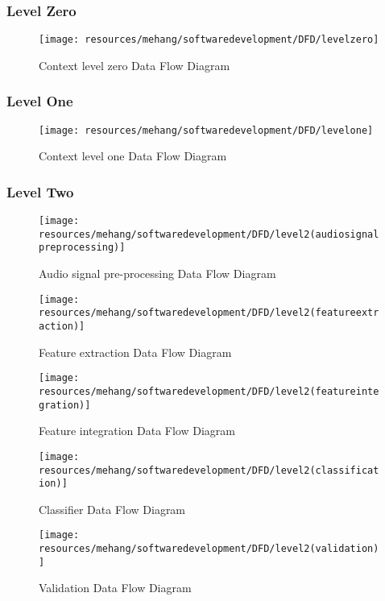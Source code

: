 \subsubsection{Level Zero}
\begin{figure}[h!]
        \centering
        \texttt{[image: resources/mehang/softwaredevelopment/DFD/levelzero]}
        \caption{Context level zero Data Flow Diagram}
        \label{fig:contextlevel}
\end{figure}
\newpage
\subsubsection{Level One}
\begin{figure}[h!]
        \texttt{[image: resources/mehang/softwaredevelopment/DFD/levelone]}
        \caption{Context level one Data Flow Diagram}
        \label{fig:level1b}
\end{figure}
\subsubsection{Level Two}
\vspace{20mm}
\begin{figure}[h!]
        \centering
        \texttt{[image: resources/mehang/softwaredevelopment/DFD/level2(audiosignalpreprocessing)]}
        \caption{Audio signal pre-processing Data Flow Diagram}
        \label{fig:pre-processing}
\end{figure}
\vspace{20mm}
\begin{figure}[h!]
        \centering
        \texttt{[image: resources/mehang/softwaredevelopment/DFD/level2(featureextraction)]}
        \caption{Feature extraction Data Flow Diagram}
\end{figure}
\vspace{90mm}
\begin{figure}[h!]
        \centering
        \texttt{[image: resources/mehang/softwaredevelopment/DFD/level2(featureintegration)]}
        \caption{Feature integration Data Flow Diagram}
\end{figure}
\vspace{90mm}
\begin{figure}[h!]
        \centering
        \texttt{[image: resources/mehang/softwaredevelopment/DFD/level2(classification)]}
        \caption{Classifier Data Flow Diagram}
        \label{fig:classifier}
\end{figure}
\vspace{50mm}
\begin{figure}[h!]
        \centering
        \texttt{[image: resources/mehang/softwaredevelopment/DFD/level2(validation)]}
        \caption{Validation Data Flow Diagram}
        \label{fig:validation}
\end{figure}
\newpage
\newpage
